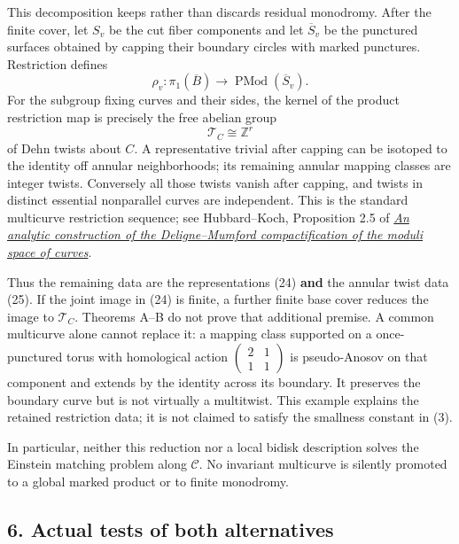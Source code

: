 \documentclass[
  11pt,
]{article}
\begin{document}
This decomposition keeps rather than discards residual monodromy. After
the finite cover, let \(S_v\) be the cut fiber components and let
\(\overline S_v\) be the punctured surfaces obtained by capping their
boundary circles with marked punctures. Restriction defines \[
 \rho_v:\pi_1(\overline B)\longrightarrow
                              \operatorname{PMod}(\overline S_v).
\tag{24}
\] For the subgroup fixing curves and their sides, the kernel of the
product restriction map is precisely the free abelian group \[
                         \mathcal T_C\cong\mathbb Z^r        \tag{25}
\] of Dehn twists about \(C\). A representative trivial after capping
can be isotoped to the identity off annular neighborhoods; its remaining
annular mapping classes are integer twists. Conversely all those twists
vanish after capping, and twists in distinct essential nonparallel
curves are independent. This is the standard multicurve restriction
sequence; see Hubbard--Koch, Proposition 2.5 of
\href{https://arxiv.org/abs/1301.0062}{\emph{An analytic construction of
the Deligne--Mumford compactification of the moduli space of curves}}.

Thus the remaining data are the representations (24) \textbf{and} the
annular twist data (25). If the joint image in (24) is finite, a further
finite base cover reduces the image to \(\mathcal T_C\). Theorems A--B
do not prove that additional premise. A common multicurve alone cannot
replace it: a mapping class supported on a once-punctured torus with
homological action
\(\left(\begin{smallmatrix}2&1\\1&1\end{smallmatrix}\right)\) is
pseudo-Anosov on that component and extends by the identity across its
boundary. It preserves the boundary curve but is not virtually a
multitwist. This example explains the retained restriction data; it is
not claimed to satisfy the smallness constant in (3).

In particular, neither this reduction nor a local bidisk description
solves the Einstein matching problem along \(\mathcal C\). No invariant
multicurve is silently promoted to a global marked product or to finite
monodromy.

\hypertarget{actual-tests-of-both-alternatives}{%
\subsection{6. Actual tests of both
alternatives}\label{actual-tests-of-both-alternatives}}
\end{document}
